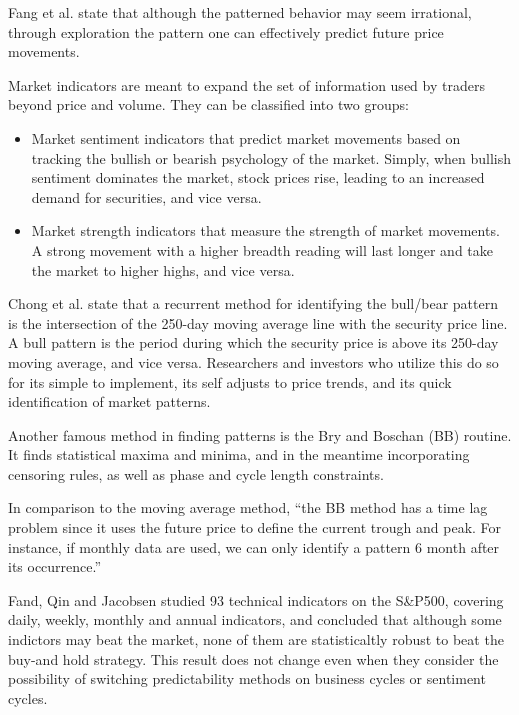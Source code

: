 \documentclass[]{book}
\providecommand{\tightlist}{%
  \setlength{\itemsep}{0pt}\setlength{\parskip}{0pt}}
\begin{document}
Fang et al. \citeyearpar{fang2014technical} state that although the patterned behavior may seem irrational, through exploration the pattern one can effectively predict future price movements.

Market indicators are meant to expand the set of information used by traders beyond price and volume. They can be classified into two groups:

\begin{itemize}
\tightlist
\item
  Market sentiment indicators that predict market movements based on tracking the bullish or bearish psychology of the market. Simply, when bullish sentiment dominates the market, stock prices rise, leading to an increased demand for securities, and vice versa.
\item
  Market strength indicators that measure the strength of market movements. A strong movement with a higher breadth reading will last longer and take the market to higher highs, and vice versa.
\end{itemize}

Chong et al. \citeyearpar{chong2010investigation} state that a recurrent method for identifying the bull/bear pattern is the intersection of the 250-day moving average line with the security price line. A bull pattern is the period during which the security price is above its 250-day moving average, and vice versa. Researchers and investors who utilize this do so for its simple to implement, its self adjusts to price trends, and its quick identification of market patterns.

Another famous method in finding patterns is the Bry and Boschan (BB) routine. It finds statistical maxima and minima, and in the meantime incorporating censoring rules, as well as phase and cycle length constraints.\citep{granger1972cyclical}

In comparison to the moving average method, ``the BB method has a time lag problem since it uses the future price to define the current trough and peak. For instance, if monthly data are used, we can only identify a pattern 6 month after its occurrence.'' \citep{chong2010investigation}

Fand, Qin and Jacobsen \citep{fang2014technical} studied 93 technical indicators on the S\&P500, covering daily, weekly, monthly and annual indicators, and concluded that although some indictors may beat the market, none of them are statisticaltly robust to beat the buy-and hold strategy. This result does not change even when they consider the possibility of switching predictability methods on business cycles or sentiment cycles.
\end{document}
